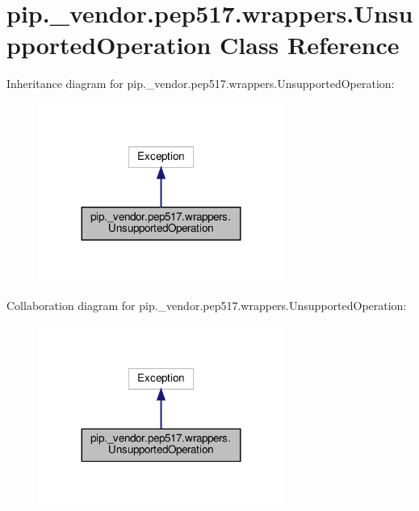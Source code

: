 \hypertarget{classpip_1_1__vendor_1_1pep517_1_1wrappers_1_1UnsupportedOperation}{}\section{pip.\+\_\+vendor.\+pep517.\+wrappers.\+Unsupported\+Operation Class Reference}
\label{classpip_1_1__vendor_1_1pep517_1_1wrappers_1_1UnsupportedOperation}


Inheritance diagram for pip.\+\_\+vendor.\+pep517.\+wrappers.\+Unsupported\+Operation\+:
\nopagebreak
\begin{figure}[H]
\begin{center}
\leavevmode
\includegraphics[width=227pt]{classpip_1_1__vendor_1_1pep517_1_1wrappers_1_1UnsupportedOperation__inherit__graph}
\end{center}
\end{figure}


Collaboration diagram for pip.\+\_\+vendor.\+pep517.\+wrappers.\+Unsupported\+Operation\+:
\nopagebreak
\begin{figure}[H]
\begin{center}
\leavevmode
\includegraphics[width=227pt]{classpip_1_1__vendor_1_1pep517_1_1wrappers_1_1UnsupportedOperation__coll__graph}
\end{center}
\end{figure}
